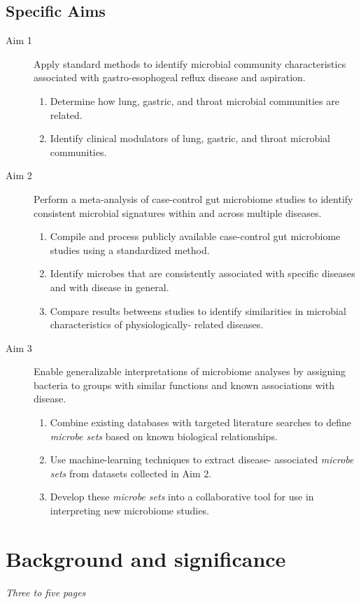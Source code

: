 \documentclass[12pt]{article}
\begin{document}
\subsection{Specific Aims}
\begin{description}
	\item[Aim 1] Apply standard methods to identify microbial 
	community characteristics associated with gastro-esophogeal reflux 
	disease and aspiration.
		\begin{enumerate}
			\item Determine how lung, gastric, and throat microbial 
			communities are related.
			\item Identify clinical modulators of lung, gastric, and 
			throat microbial communities.
		\end{enumerate}
	\item[Aim 2] Perform a meta-analysis of case-control gut 
	microbiome studies to identify consistent microbial signatures 
	within and across multiple diseases.
	\begin{enumerate}
		\item Compile and process publicly available case-control gut 
		microbiome studies using a standardized method.
		\item Identify microbes that are consistently associated with 
		specific diseases and with disease in general.
		\item Compare results betweens studies to identify 
		similarities in microbial characteristics of physiologically-
		related diseases.
	\end{enumerate}
	\item[Aim 3] Enable generalizable interpretations of microbiome 
	analyses by assigning bacteria to groups with similar functions 
	and known associations with disease.
	\begin{enumerate}
	\item Combine existing databases with targeted literature searches 
	to define \textit{microbe sets} based on known biological 
	relationships.
	\item Use machine-learning techniques to extract disease-
	associated \textit{microbe sets} from datasets collected in Aim 2.
	\item Develop these \textit{microbe sets} into a collaborative 
	tool for use in interpreting new microbiome studies.
	\end{enumerate}
\end{description}
\newpage

\section{Background and significance}
\textit{Three to five pages}
\end{document}
